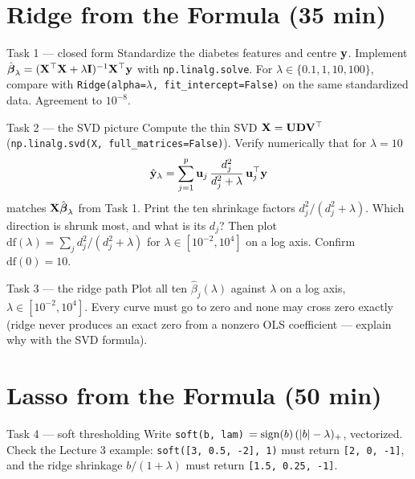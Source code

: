 \documentclass[11pt]{article}
\begin{document}
\section{Ridge from the Formula (35 min)}

\begin{task}{Task 1 --- closed form}
Standardize the diabetes features and centre $\mathbf{y}$. Implement
$\hat{\boldsymbol{\beta}}_\lambda=(\mathbf{X}^{\top}\mathbf{X}+\lambda\mathbf{I})^{-1}\mathbf{X}^{\top}\mathbf{y}$ with \texttt{np.linalg.solve}. For $\lambda\in\{0.1,1,10,100\}$,
compare with \texttt{Ridge(alpha=$\lambda$, fit\_intercept=False)} on the same standardized data. Agreement to $10^{-8}$.
\end{task}

\begin{task}{Task 2 --- the SVD picture}
Compute the thin SVD $\mathbf{X}=\mathbf{U}\mathbf{D}\mathbf{V}^{\top}$ (\texttt{np.linalg.svd(X, full\_matrices=False)}). Verify numerically
that for $\lambda=10$
\[
\hat{\mathbf{y}}_\lambda=\sum_{j=1}^p\mathbf{u}_j\,\frac{d_j^2}{d_j^2+\lambda}\,\mathbf{u}_j^{\top}\mathbf{y}
\]
matches $\mathbf{X}\hat{\boldsymbol{\beta}}_\lambda$ from Task 1. Print the ten shrinkage factors $d_j^2/(d_j^2+\lambda)$. Which
direction is shrunk most, and what is its $d_j$? Then plot $\mathrm{df}(\lambda)=\sum_jd_j^2/(d_j^2+\lambda)$
for $\lambda\in[10^{-2},10^4]$ on a log axis. Confirm $\mathrm{df}(0)=10$.
\end{task}

\begin{task}{Task 3 --- the ridge path}
Plot all ten $\hat\beta_j(\lambda)$ against $\lambda$ on a log axis, $\lambda\in[10^{-2},10^4]$. Every curve
must go to zero and none may cross zero exactly (ridge never produces an exact zero from a nonzero OLS
coefficient --- explain why with the SVD formula).
\end{task}

\section{Lasso from the Formula (50 min)}

\begin{task}{Task 4 --- soft thresholding}
Write \texttt{soft(b, lam)} $=\operatorname{sign}(b)\,(\left\lvert b \right\rvert-\lambda)_+$, vectorized. Check the Lecture 3 example:
\texttt{soft([3, 0.5, -2], 1)} must return \texttt{[2, 0, -1]}, and the ridge shrinkage $b/(1+\lambda)$
must return \texttt{[1.5, 0.25, -1]}.
\end{task}
\end{document}
